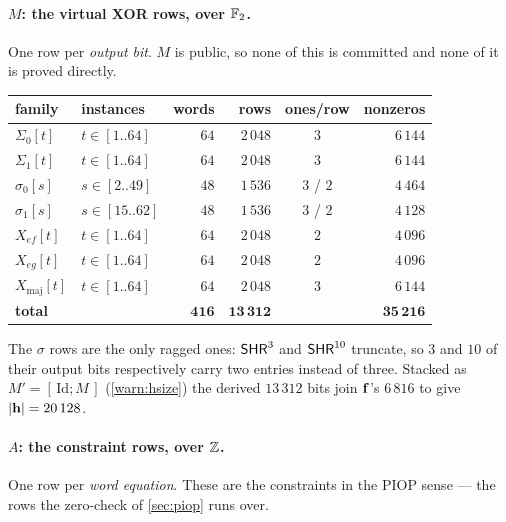 \paragraph{$M$: the virtual XOR rows, over $\mathbb{F}_2$.} One row per \emph{output
bit}. $M$ is public, so none of this is committed and none of it is proved
directly.

\begin{center}\small
\begin{tabular}{@{}llrrcr@{}}
\toprule
family & instances & words & rows & ones/row & nonzeros\\
\midrule
$\Sigma_0[t]$          & $t\in[1..64]$   & $64$ & $2\,048$ & $3$     & $6\,144$\\
$\Sigma_1[t]$          & $t\in[1..64]$   & $64$ & $2\,048$ & $3$     & $6\,144$\\
$\sigma_0[s]$          & $s\in[2..49]$   & $48$ & $1\,536$ & $3$ / $2$ & $4\,464$\\
$\sigma_1[s]$          & $s\in[15..62]$  & $48$ & $1\,536$ & $3$ / $2$ & $4\,128$\\
$X_{ef}[t]$            & $t\in[1..64]$   & $64$ & $2\,048$ & $2$     & $4\,096$\\
$X_{eg}[t]$            & $t\in[1..64]$   & $64$ & $2\,048$ & $2$     & $4\,096$\\
$X_{\mathrm{maj}}[t]$  & $t\in[1..64]$   & $64$ & $2\,048$ & $3$     & $6\,144$\\
\midrule
\textbf{total}         &                 & $\mathbf{416}$ & $\mathbf{13\,312}$
                       &                 & $\mathbf{35\,216}$\\
\bottomrule
\end{tabular}
\end{center}

\noindent
The $\sigma$ rows are the only ragged ones: $\mathsf{SHR}^3$ and $\mathsf{SHR}^{10}$ truncate, so
$3$ and $10$ of their output bits respectively carry two entries instead of
three. Stacked as $M'=[\,\mathrm{Id};M\,]$ (\cref{warn:hsize}) the derived
$13\,312$ bits join $\mathbf{f}$'s $6\,816$ to give $|\mathbf{h}|=20\,128$.

\paragraph{$A$: the constraint rows, over $\mathbb{Z}$.} One row per \emph{word
equation}. These are the constraints in the PIOP sense --- the rows the
zero-check of \cref{sec:piop} runs over.

